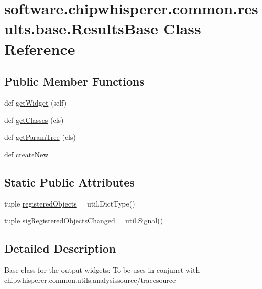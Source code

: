 \hypertarget{classsoftware_1_1chipwhisperer_1_1common_1_1results_1_1base_1_1ResultsBase}{}\section{software.\+chipwhisperer.\+common.\+results.\+base.\+Results\+Base Class Reference}
\label{classsoftware_1_1chipwhisperer_1_1common_1_1results_1_1base_1_1ResultsBase}
\subsection*{Public Member Functions}
\begin{DoxyCompactItemize}
\item 
def \hyperlink{classsoftware_1_1chipwhisperer_1_1common_1_1results_1_1base_1_1ResultsBase_aefcd936de015bb84991229618e8d473f}{get\+Widget} (self)
\item 
def \hyperlink{classsoftware_1_1chipwhisperer_1_1common_1_1results_1_1base_1_1ResultsBase_acd0c18272ae6410fe2c9dbcc7884f095}{get\+Classes} (cls)
\item 
def \hyperlink{classsoftware_1_1chipwhisperer_1_1common_1_1results_1_1base_1_1ResultsBase_ab6af8d14e5f8034d682f2c680f5aec54}{get\+Param\+Tree} (cls)
\item 
def \hyperlink{classsoftware_1_1chipwhisperer_1_1common_1_1results_1_1base_1_1ResultsBase_aa595d8c9d35dc83fecc439569a05a95e}{create\+New}
\end{DoxyCompactItemize}
\subsection*{Static Public Attributes}
\begin{DoxyCompactItemize}
\item 
tuple \hyperlink{classsoftware_1_1chipwhisperer_1_1common_1_1results_1_1base_1_1ResultsBase_ac0d733a6098da1cedab98f46a587beb6}{registered\+Objects} = util.\+Dict\+Type()
\item 
tuple \hyperlink{classsoftware_1_1chipwhisperer_1_1common_1_1results_1_1base_1_1ResultsBase_a49a8dbf8a5790e3153def3b292510715}{sig\+Registered\+Objects\+Changed} = util.\+Signal()
\end{DoxyCompactItemize}


\subsection{Detailed Description}
\begin{DoxyVerb}Base class for the output widgets:
To be uses in conjunct with chipwhisperer.common.utils.analysissource/tracesource
\end{DoxyVerb}
 


